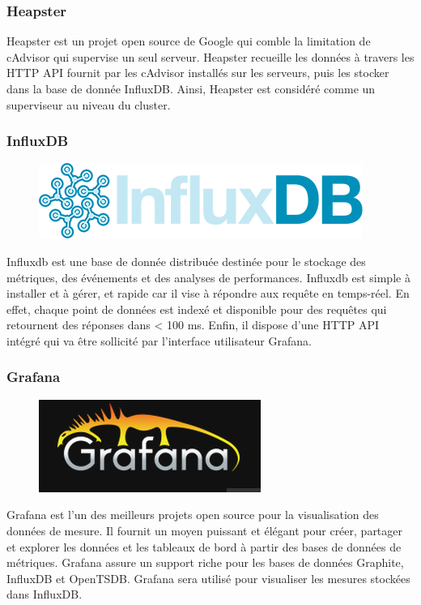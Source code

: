 \begin{onehalfspace}
\subsubsection*{Heapster}

Heapster est un projet open source de Google qui comble la limitation de cAdvisor qui supervise un seul serveur. Heapster recueille les données à travers les HTTP API fournit par les cAdvisor installés sur les serveurs, puis les stocker dans la base de donnée InfluxDB. Ainsi, Heapster est considéré comme un superviseur au niveau du cluster.

\subsubsection*{InfluxDB}

\begin{figure}
\centering
\includegraphics[scale=0.2]{chapitre5/assets/influxdb}
\end{figure}
\noindent Influxdb est une base de donnée distribuée destinée pour le stockage des métriques, des événements et des analyses de performances. Influxdb est simple à installer et à gérer, et rapide car il vise à répondre aux requête en temps-réel. En effet, chaque point de données est indexé et disponible pour des requêtes qui retournent des réponses dans < 100 ms. Enfin, il dispose d'une HTTP API intégré qui va être sollicité par l'interface utilisateur Grafana.

\subsubsection*{Grafana}

\begin{figure}
\centering
\includegraphics[scale=0.3]{chapitre5/assets/grafana}
\end{figure}
\noindent Grafana est l'un des meilleurs projets open source pour la visualisation des données de mesure. Il fournit un moyen puissant et élégant pour créer, partager et explorer les données et les tableaux de bord à partir des bases de données de métriques. Grafana assure un support riche pour les bases de données Graphite, InfluxDB et OpenTSDB. Grafana sera utilisé pour visualiser les mesures stockées dans InfluxDB.



\end{onehalfspace}
